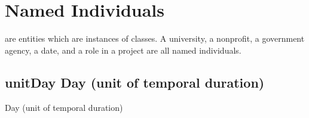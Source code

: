 \documentclass[letterpaper,10pt,english]{sphinxmanual}
\begin{document}
\chapter{Named Individuals}
\label{\detokenize{named-individuals:named-individuals}}\label{\detokenize{named-individuals::doc}}
\sphinxAtStartPar
{} are entities which are instances of classes.  A university, a
non\sphinxhyphen{}profit, a government agency, a date, and a role in a project are all named individuals.
\begin{quote}
\label{\detokenize{doc-unitDay:unitday}}\label{\detokenize{doc-unitDay:day-unit-of-temporal-duration}}\label{\detokenize{doc-unitDay:unitday}}
\ignorespaces \end{quote}


\section{unitDay \sphinxhyphen{} Day (unit of temporal duration)}
\label{\detokenize{doc-unitDay:unitday-day-unit-of-temporal-duration}}\label{\detokenize{doc-unitDay:index-0}}\label{\detokenize{doc-unitDay::doc}}
\begin{sphinxShadowBox}

\sphinxAtStartPar
Day (unit of temporal duration)
\end{sphinxShadowBox}
\begin{quote}
\label{\detokenize{doc-unitHour:unithour}}\label{\detokenize{doc-unitHour:hour-unit-of-temporal-duration}}\label{\detokenize{doc-unitHour:unithour}}
\ignorespaces \end{quote}
\end{document}
